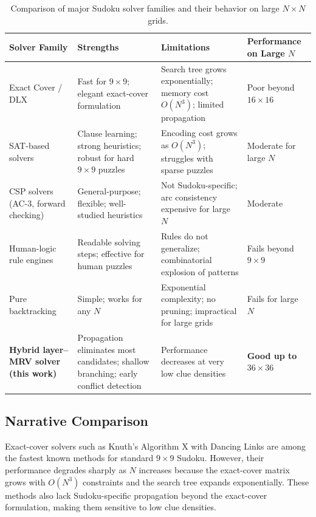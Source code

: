 \documentclass[11pt]{article}
\begin{document}
\begin{table}[h]
\centering
\begin{tabular}{@{}p{3cm}p{4.5cm}p{4.5cm}p{3cm}@{}}
\toprule
Solver Family & Strengths & Limitations & Performance on Large $N$ \\
\midrule
Exact Cover / DLX \cite{knuth2000dlx} &
Fast for $9 \times 9$; elegant exact-cover formulation &
Search tree grows exponentially; memory cost $O(N^3)$; limited propagation &
Poor beyond $16 \times 16$ \\

SAT-based solvers \cite{een2003sat,soos2010cryptominisat} &
Clause learning; strong heuristics; robust for hard $9 \times 9$ puzzles &
Encoding cost grows as $O(N^3)$; struggles with sparse puzzles &
Moderate for large $N$ \\

CSP solvers (AC-3, forward checking) \cite{russellnorvig} &
General-purpose; flexible; well-studied heuristics &
Not Sudoku-specific; arc consistency expensive for large $N$ &
Moderate \\

Human-logic rule engines \cite{berthier2007} &
Readable solving steps; effective for human puzzles &
Rules do not generalize; combinatorial explosion of patterns &
Fails beyond $9 \times 9$ \\

Pure backtracking &
Simple; works for any $N$ &
Exponential complexity; no pruning; impractical for large grids &
Fails for large $N$ \\

\textbf{Hybrid layer--MRV solver (this work)} &
Propagation eliminates most candidates; shallow branching; early conflict detection &
Performance decreases at very low clue densities &
\textbf{Good up to $36 \times 36$} \\
\bottomrule
\end{tabular}
\caption{Comparison of major Sudoku solver families and their behavior on large $N \times N$ grids.}
\label{tab:solvercomparison}
\end{table}

\subsection{Narrative Comparison}

Exact-cover solvers such as Knuth's Algorithm X with Dancing Links
\cite{knuth2000dlx} are among the fastest known methods for standard $9 \times 9$
Sudoku. However, their performance degrades sharply as $N$ increases because the
exact-cover matrix grows with $O(N^3)$ constraints and the search tree expands
exponentially. These methods also lack Sudoku-specific propagation beyond the
exact-cover formulation, making them sensitive to low clue densities.
\end{document}
